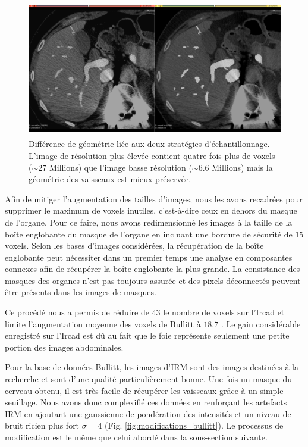 \begin{figure}[!ht]
  \centering
  \includegraphics[height=6cm]{Images/resolution_comparison.png}
  \caption{Différence de géométrie liée aux deux stratégies d'échantillonnage. L'image de résolution plus élevée contient quatre fois plus de voxels ($\sim 27$ Millions) que l'image basse résolution ($\sim 6.6$ Millions) mais la géométrie des vaisseaux est mieux préservée.}
  \label{fig:resolution_comparison}
\end{figure}

Afin de mitiger l'augmentation des tailles d'images, nous les avons recadrées pour supprimer le maximum de voxels inutiles, c'est-à-dire ceux en dehors du masque de l'organe. Pour ce faire, nous avons redimensionné les images à la taille de la boîte englobante du masque de l'organe en incluant une bordure de sécurité de $15$ voxels. Selon les bases d'images considérées, la récupération de la boîte englobante peut nécessiter dans un premier temps une analyse en composantes connexes afin de récupérer la boîte englobante la plus grande. La consistance des masques des organes n'est pas toujours assurée et des pixels déconnectés peuvent être présents dans les images de masques.

Ce procédé nous a permis de réduire de $43$ \percent{}le nombre de voxels sur l'Ircad et limite l'augmentation moyenne des voxels de Bullitt à $18.7$ \percent. Le gain considérable enregistré sur l'Ircad est dû au fait que le foie représente seulement une petite portion des images abdominales.

Pour la base de données Bullitt, les images d'IRM sont des images destinées à la recherche et sont d'une qualité particulièrement bonne. Une fois un masque du cerveau obtenu, il est très facile de récupérer les vaisseaux grâce à un simple seuillage. Nous avons donc complexifié ces données en renforçant les artefacts IRM en ajoutant une gaussienne de pondération des intensités et un niveau de bruit ricien plus fort $\sigma=4$ (Fig. \ref{fig:modifications_bullitt}). Le processus de modification est le même que celui abordé dans la sous-section suivante.

